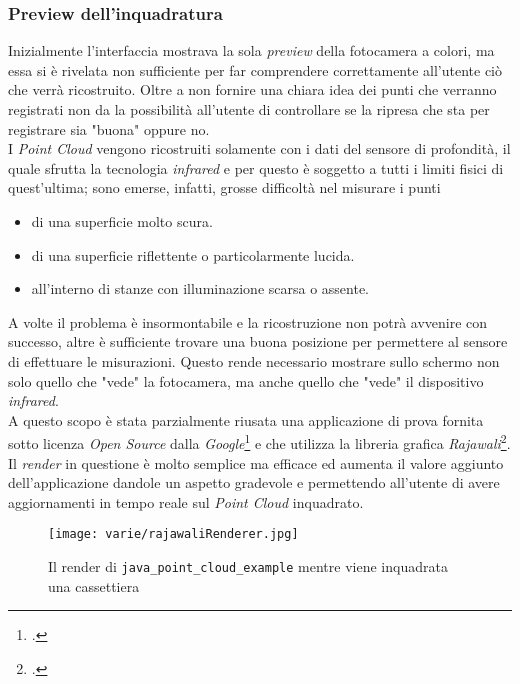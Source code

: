 \subsubsection{Preview dell'inquadratura}
\label{cap:frame_preview}
Inizialmente l'interfaccia mostrava la sola \emph{preview} della fotocamera a colori, ma essa si è rivelata non sufficiente per far comprendere correttamente all'utente ciò che verrà ricostruito. Oltre a non fornire una chiara idea dei punti che verranno registrati non da la possibilità all'utente di controllare se la ripresa che sta per registrare sia "buona" oppure no.\\
I \emph{Point Cloud} vengono ricostruiti solamente con i dati del sensore di profondità, il quale sfrutta la tecnologia \emph{infrared} e per questo è soggetto a tutti i limiti fisici di quest'ultima; sono emerse, infatti, grosse difficoltà nel misurare i punti
\begin{itemize}
	\item di una superficie molto scura.
	\item di una superficie riflettente o particolarmente lucida.
	\item all'interno di stanze con illuminazione scarsa o assente.
\end{itemize}
A volte il problema è insormontabile e la ricostruzione non potrà avvenire con successo, altre è sufficiente trovare una buona posizione per permettere al sensore di effettuare le misurazioni. Questo rende necessario mostrare sullo schermo non solo quello che "vede" la fotocamera, ma anche quello che "vede" il dispositivo \emph{infrared}.\\
A questo scopo è stata parzialmente riusata una applicazione di prova fornita sotto licenza \emph{Open Source} dalla \emph{Google}\footcite{GitHub: https://github.com/googlesamples/tango-examples-java} e che utilizza la libreria grafica \emph{Rajawali}\footcite{GitHub: https://github.com/Rajawali/Rajawali}.\\
Il \emph{render} in questione è molto semplice ma efficace ed aumenta il valore aggiunto dell'applicazione dandole un aspetto gradevole e permettendo all'utente di avere aggiornamenti in tempo reale sul \emph{Point Cloud} inquadrato.
\begin{figure}[H] 
    \centering 
    \texttt{[image: varie/rajawaliRenderer.jpg]} 
    \caption{Il render di \texttt{java\_point\_cloud\_example} mentre viene inquadrata una cassettiera}
\end{figure}


